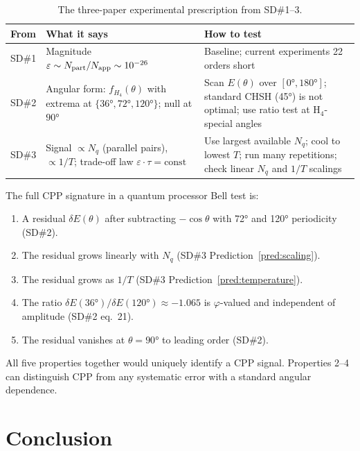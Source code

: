 \documentclass[11pt,letterpaper]{article}
\newcommand{\phig}{\varphi}
\newcommand{\eps}{\varepsilon}
\begin{document}
\begin{table}[H]
\centering
\caption{The three-paper experimental prescription from SD\#1--3.}
\label{tab:programme}
\begin{tabular}{@{}p{2cm}p{5cm}p{5.5cm}@{}}
\toprule
From & What it says & How to test \\
\midrule
SD\#1 & Magnitude $\eps \sim N_{\rm part}/N_{\rm app} \sim 10^{-26}$ &
  Baseline; current experiments 22 orders short \\[4pt]
SD\#2 & Angular form: $f_{H_4}(\theta)$ with extrema at $\{36°, 72°, 120°\}$;
  null at $90°$ &
  Scan $E(\theta)$ over $[0°, 180°]$; standard CHSH (45°) is not optimal;
  use ratio test at H$_4$-special angles \\[4pt]
SD\#3 & Signal $\propto N_q$ (parallel pairs), $\propto 1/T$;
  trade-off law $\eps \cdot \tau = \text{const}$ &
  Use largest available $N_q$; cool to lowest $T$;
  run many repetitions; check linear $N_q$ and $1/T$ scalings \\
\bottomrule
\end{tabular}
\end{table}

The full CPP signature in a quantum processor Bell test is:
\begin{enumerate}
\item A residual $\delta E(\theta)$ after subtracting $-\cos\theta$
  with 72° and 120° periodicity (SD\#2).
\item The residual grows linearly with $N_q$ (SD\#3
  Prediction~\ref{pred:scaling}).
\item The residual grows as $1/T$ (SD\#3 Prediction~\ref{pred:temperature}).
\item The ratio $\delta E(36°)/\delta E(120°) \approx -1.065$ is
  $\phig$-valued and independent of amplitude (SD\#2 eq.~21).
\item The residual vanishes at $\theta = 90°$ to leading order (SD\#2).
\end{enumerate}

All five properties together would uniquely identify a CPP signal.
Properties 2--4 can distinguish CPP from any systematic error with
a standard angular dependence.

\section{Conclusion}
\end{document}

